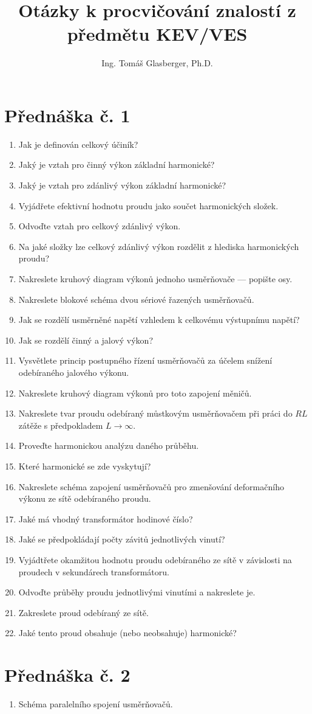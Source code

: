 \documentclass[a4paper, 12pt]{article}
\title{Otázky k procvičování znalostí z předmětu KEV/VES}
\author{Ing. Tomáš Glasberger, Ph.D.}
\begin{document}
\maketitle

\section{Přednáška č. 1}
\begin{enumerate}
    \item Jak je definován celkový účiník?
    \item Jaký je vztah pro činný výkon základní harmonické?
    \item Jaký je vztah pro zdánlivý výkon základní harmonické?
    \item Vyjádřete efektivní hodnotu proudu jako součet harmonických složek.
    \item Odvoďte vztah pro celkový zdánlivý výkon.
    \item Na jaké složky lze celkový zdánlivý výkon rozdělit z hlediska harmonických proudu?
    \item Nakreslete kruhový diagram výkonů jednoho usměrňovače --- popište osy.
    \item Nakreslete blokové schéma dvou sériové řazených usměrňovačů. 
    \item Jak se rozdělí usměrněné napětí vzhledem k celkovému výstupnímu napětí?
    \item Jak se rozdělí činný a jalový výkon?
    \item Vysvětlete princip postupného řízení usměrňovačů za účelem snížení
      odebíraného jalového výkonu.
    \item Nakreslete kruhový diagram výkonů pro toto zapojení měničů.
    \item Nakreslete tvar proudu odebíraný můstkovým usměrňovačem při práci do
        $RL$ zátěže s předpokladem $L\rightarrow \infty $.
    \item Proveďte harmonickou analýzu daného průběhu. 
    \item Které harmonické se zde
        vyskytují?
    \item Nakreslete schéma zapojení usměrňovačů pro zmenšování deformačního
      výkonu ze sítě odebíraného proudu.
    \item Jaké má vhodný transformátor hodinové číslo?
    \item Jaké se předpokládají počty závitů jednotlivých vinutí?
    \item Vyjádtřete okamžitou hodnotu proudu odebíraného ze sítě v závislosti
      na proudech v sekundárech transformátoru.
    \item Odvoďte průběhy proudu jednotlivými vinutími a nakreslete je.
    \item Zakreslete proud odebíraný ze sítě.
    \item Jaké tento proud obsahuje (nebo neobsahuje) harmonické?

\end{enumerate}

\section{Přednáška č. 2}
\begin{enumerate}
  \item Schéma paralelního spojení usměrňovačů.
  \end{enumerate}
\end{document}
